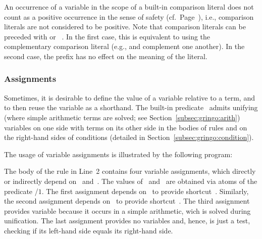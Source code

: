 \begin{Note}
An occurrence of a variable in the scope of a built-in comparison literal
does not count as a positive occurrence in the sense of safety (cf.\ Page~\pageref{pg:safe}),
i.e.,
comparison literals are not considered to be positive.
Note that comparison literals can be preceded with  or ~.
In the first case, this is equivalent to using the complementary comparison literal 
(e.g., \code{<} and \code{>=} complement one another).
In the second case, the prefix has no effect on the meaning of the literal.
%
\end{Note}

\subsubsection{Assignments}\label{subsec:gringo:assign}

Sometimes, it is desirable to define the value of a variable relative to a term, 
and to then reuse the variable as a shorthand.
The built-in predicate~\code{=} admits unifying
(where simple arithmetic terms are solved; see Section~\ref{subsec:gringo:arith})
variables on one side with terms on its other side
in the bodies of rules and on the right-hand sides of conditions
(detailed in Section~\ref{subsec:gringo:condition}).

\begin{example}\label{ex:assign}
The usage of variable assignments is illustrated by the following program:%
%
%

%
The body of the rule in Line~2 contains four variable assignments,
which directly or indirectly depend on~ and~.
The values of~ and~ are obtained via atoms of the predicate /$1$.
The first assignment depends on~ to provide shortcut~.
Similarly, the second assignment depends on~ to provide shortcut~.
The third assignment provides variable  because it occurs in a simple arithmetic,
wich is solved during unification.
The last assignment provides no variables and,
hence, is just a test,
checking if its left-hand side equals its right-hand side.
\eexample
\end{example}

